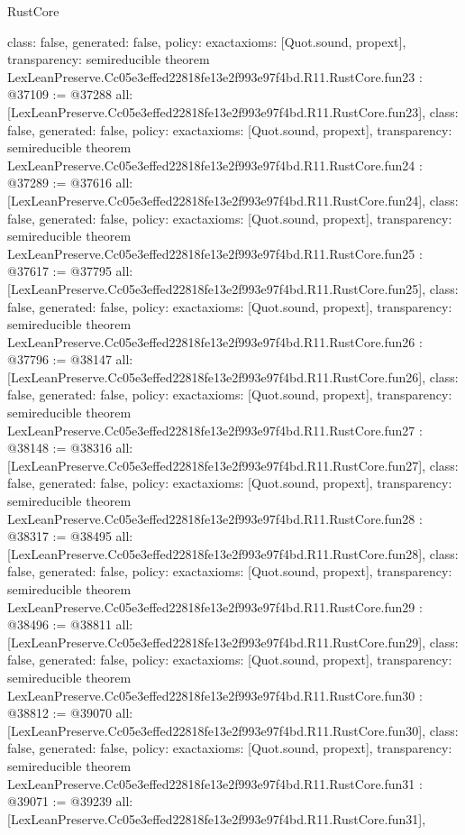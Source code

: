 \begin{lexlean}{RustCore}
\begin{coremodule}
{  class: false,
  generated: false,
  policy: exact{axioms: [Quot.sound, propext]},
  transparency: semireducible
}
theorem LexLeanPreserve.Cc05e3effed22818fe13e2f993e97f4bd.R11.RustCore.fun23 : @37109 := @37288 {
  all: [LexLeanPreserve.Cc05e3effed22818fe13e2f993e97f4bd.R11.RustCore.fun23],
  class: false,
  generated: false,
  policy: exact{axioms: [Quot.sound, propext]},
  transparency: semireducible
}
theorem LexLeanPreserve.Cc05e3effed22818fe13e2f993e97f4bd.R11.RustCore.fun24 : @37289 := @37616 {
  all: [LexLeanPreserve.Cc05e3effed22818fe13e2f993e97f4bd.R11.RustCore.fun24],
  class: false,
  generated: false,
  policy: exact{axioms: [Quot.sound, propext]},
  transparency: semireducible
}
theorem LexLeanPreserve.Cc05e3effed22818fe13e2f993e97f4bd.R11.RustCore.fun25 : @37617 := @37795 {
  all: [LexLeanPreserve.Cc05e3effed22818fe13e2f993e97f4bd.R11.RustCore.fun25],
  class: false,
  generated: false,
  policy: exact{axioms: [Quot.sound, propext]},
  transparency: semireducible
}
theorem LexLeanPreserve.Cc05e3effed22818fe13e2f993e97f4bd.R11.RustCore.fun26 : @37796 := @38147 {
  all: [LexLeanPreserve.Cc05e3effed22818fe13e2f993e97f4bd.R11.RustCore.fun26],
  class: false,
  generated: false,
  policy: exact{axioms: [Quot.sound, propext]},
  transparency: semireducible
}
theorem LexLeanPreserve.Cc05e3effed22818fe13e2f993e97f4bd.R11.RustCore.fun27 : @38148 := @38316 {
  all: [LexLeanPreserve.Cc05e3effed22818fe13e2f993e97f4bd.R11.RustCore.fun27],
  class: false,
  generated: false,
  policy: exact{axioms: [Quot.sound, propext]},
  transparency: semireducible
}
theorem LexLeanPreserve.Cc05e3effed22818fe13e2f993e97f4bd.R11.RustCore.fun28 : @38317 := @38495 {
  all: [LexLeanPreserve.Cc05e3effed22818fe13e2f993e97f4bd.R11.RustCore.fun28],
  class: false,
  generated: false,
  policy: exact{axioms: [Quot.sound, propext]},
  transparency: semireducible
}
theorem LexLeanPreserve.Cc05e3effed22818fe13e2f993e97f4bd.R11.RustCore.fun29 : @38496 := @38811 {
  all: [LexLeanPreserve.Cc05e3effed22818fe13e2f993e97f4bd.R11.RustCore.fun29],
  class: false,
  generated: false,
  policy: exact{axioms: [Quot.sound, propext]},
  transparency: semireducible
}
theorem LexLeanPreserve.Cc05e3effed22818fe13e2f993e97f4bd.R11.RustCore.fun30 : @38812 := @39070 {
  all: [LexLeanPreserve.Cc05e3effed22818fe13e2f993e97f4bd.R11.RustCore.fun30],
  class: false,
  generated: false,
  policy: exact{axioms: [Quot.sound, propext]},
  transparency: semireducible
}
theorem LexLeanPreserve.Cc05e3effed22818fe13e2f993e97f4bd.R11.RustCore.fun31 : @39071 := @39239 {
  all: [LexLeanPreserve.Cc05e3effed22818fe13e2f993e97f4bd.R11.RustCore.fun31],
}
\end{coremodule}
\end{lexlean}
